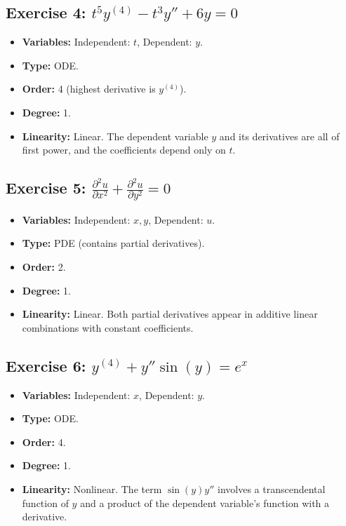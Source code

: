 \documentclass[11pt,letterpaper]{article}
\begin{document}
\subsection*{Exercise 4: $t^5 y^{(4)} - t^3 y'' + 6y = 0$}
\begin{itemize}
    \item \textbf{Variables:} Independent: $t$, Dependent: $y$.
    \item \textbf{Type:} ODE.
    \item \textbf{Order:} 4 (highest derivative is $y^{(4)}$).
    \item \textbf{Degree:} 1.
    \item \textbf{Linearity:} Linear. The dependent variable $y$ and its derivatives are all of first power, and the coefficients depend only on $t$.
\end{itemize}

\subsection*{Exercise 5: $\frac{\partial^2 u}{\partial x^2} + \frac{\partial^2 u}{\partial y^2} = 0$}
\begin{itemize}
    \item \textbf{Variables:} Independent: $x, y$, Dependent: $u$.
    \item \textbf{Type:} PDE (contains partial derivatives).
    \item \textbf{Order:} 2.
    \item \textbf{Degree:} 1.
    \item \textbf{Linearity:} Linear. Both partial derivatives appear in additive linear combinations with constant coefficients.
\end{itemize}

\subsection*{Exercise 6: $y^{(4)} + y'' \sin(y) = e^x$}
\begin{itemize}
    \item \textbf{Variables:} Independent: $x$, Dependent: $y$.
    \item \textbf{Type:} ODE.
    \item \textbf{Order:} 4.
    \item \textbf{Degree:} 1.
    \item \textbf{Linearity:} Nonlinear. The term $\sin(y) y''$ involves a transcendental function of $y$ and a product of the dependent variable's function with a derivative.
\end{itemize}
\end{document}
